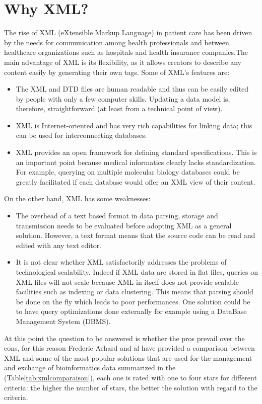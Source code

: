 \section{Why XML?}
The rise of XML (eXtensible Markup Language) in patient care has been driven by the needs for communication among health professionals and between healthcare organizations such as hospitals and health insurance companies.The main advantage of XML is its flexibility, as it allows creators to describe any content easily by generating their own tags\cite{thuy2012s}. Some of XML’s features are\cite{achard2001xml}:
\begin{itemize}
\renewcommand{\labelitemi}{$\bullet$}
\item The XML and DTD files are human readable and thus can be easily edited by people with only a few computer skills. Updating a data model is, therefore, straightforward (at least from a technical point of view).
\item XML is Internet-oriented and has very rich capabilities for linking data; this can be used for interconnecting databases.
\item XML provides an open framework for defining standard specifications. This is an important point because medical informatics clearly lacks standardization. For example, querying on multiple molecular biology databases could be greatly facilitated if each database would offer an XML view of their content.
\end{itemize}
On the other hand, XML has some weaknesses:
\begin{itemize}
\renewcommand{\labelitemi}{$\bullet$}
\item The overhead of a text based format in data parsing, storage and transmission needs to be evaluated before adopting XML as a general solution. However, a text format means that the source code can be read and edited with any text editor.
\item It is not clear whether XML satisfactorily addresses the problems of technological scalability. Indeed if XML data are stored in flat files, queries on XML files will not scale because XML in itself does not provide scalable facilities such as indexing or data clustering. This means that parsing should be done on the fly which leads to poor performances. One solution could be to have query optimizations done externally for example using a DataBase Management System (DBMS).
\end{itemize}
\bigbreak
At this point the question to be answered is whether the pros prevail over the cons, for this reason Frederic Achard and al\cite{achard2001xml}  have provided a comparison between XML and some of the most popular solutions that are used for the management and exchange of bioinformatics data summarized in the (Table\ref{tab:xmlcomparaison}), each one is rated with one to four stars for different criteria: the higher the number of stars, the better the solution with regard to the criteria.
